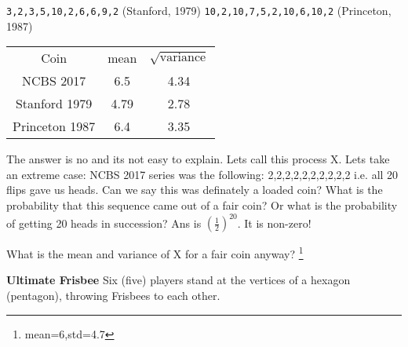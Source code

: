 \documentclass[a4paper,9pt, addpoints, solutions]{exam}
\begin{document}
\begin{questions}
\verb|3,2,3,5,10,2,6,6,9,2|     (Stanford, 1979)
\verb|10,2,10,7,5,2,10,6,10,2|  (Princeton, 1987)


\begin{solution}
\begin{tabular}{c c  c}
 Coin         & mean & $\sqrt{\text{variance}}$ \\
NCBS 2017     & 6.5  & 4.34  \\
Stanford 1979 & 4.79 & 2.78  \\
Princeton 1987& 6.4  & 3.35  \\
\end{tabular}

The answer is no and its not easy to explain.
Lets call this process X. Lets take an extreme case: NCBS 2017 series was the
following: 2,2,2,2,2,2,2,2,2,2 i.e. all 20 flips gave us heads. Can we say this
was definately a loaded coin? What is the probability that this sequence came
out of a fair coin? Or what is the probability of getting 20 heads in
succession? Ans is $(\frac{1}{2})^{20}$. It is non-zero!

What is the mean and variance of X for a fair coin anyway?  \footnote{mean=6,std=4.7}
\end{solution} 

\question[10] \textbf{Ultimate Frisbee} 
Six (five) players stand at the vertices of a hexagon (pentagon), throwing
Frisbees to each other.

\end{questions}
\end{document}
